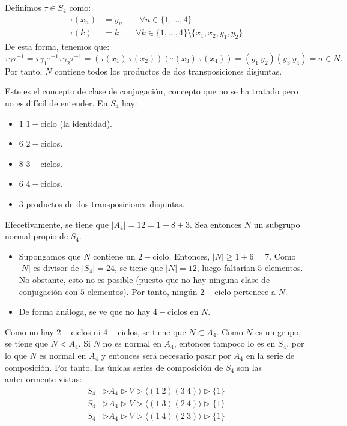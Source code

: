 \begin{ejercicio}
\begin{enumerate}
\begin{itemize}
            Definimos $\tau\in S_4$ como:
            \begin{align*}
                \tau(x_n) &= y_n\qquad \forall n\in \{1,\ldots,4\} \\
                \tau(k) &= k\qquad \forall k\in \{1,\ldots,4\}\setminus\{x_1,x_2,y_1,y_2\}
            \end{align*}
            De esta forma, tenemos que:
            \begin{equation*}
                \tau\gamma\tau^{-1} = \tau\gamma_1\tau^{-1}\tau\gamma_2\tau^{-1} = (\tau(x_1)\ \tau(x_2))(\tau(x_3)\ \tau(x_4)) = (y_1\ y_2)(y_3\ y_4)=\sigma\in N.
            \end{equation*}
            Por tanto, $N$ contiene todos los productos de dos transposiciones disjuntas.
        \end{itemize}
        Este es el concepto de clase de conjugación, concepto que no se ha tratado pero no es difícil de entender. En $S_4$ hay:
        \begin{itemize}
            \item $1$ $1-$ciclo (la identidad).
            \item $6$ $2-$ciclos.
            \item $8$ $3-$ciclos.
            \item $6$ $4-$ciclos.
            \item $3$ productos de dos transposiciones disjuntas.
        \end{itemize}

        Efecetivamente, se tiene que $|A_4|=12=1+8+3$. Sea entonces $N$ un subgrupo normal propio de $S_4$.
        \begin{itemize}
            \item Supongamos que $N$ contiene un $2-$ciclo. Entonces, $|N|\geq 1+6=7$. Como $|N|$ es divisor de $|S_4|=24$, se tiene que $|N|=12$, luego faltarían $5$ elementos. No obstante, esto no es posible (puesto que no hay ninguna clase de conjugación con $5$ elementos). Por tanto, ningún $2-$ciclo pertenece a $N$.
            \item De forma análoga, se ve que no hay $4-$ciclos en $N$.
        \end{itemize}
        Como no hay $2-$ciclos ni $4-$ciclos, se tiene que $N\subset A_4$. Como $N$ es un grupo, se tiene que $N<A_4$. Si $N$ no es normal en $A_4$, entonces tampoco lo es en $S_4$, por lo que $N$ es normal en $A_4$ y entonces será necesario pasar por $A_4$ en la serie de composición.
        Por tanto, las únicas series de composición de $S_4$ son las anteriormente vistas:
        \begin{align*}
            S_4 &\rhd A_4 \rhd V \rhd \langle (1\ 2)(3\ 4) \rangle  \rhd \{1\} \\
            S_4 &\rhd A_4 \rhd V \rhd \langle (1\ 3)(2\ 4) \rangle  \rhd \{1\} \\
            S_4 &\rhd A_4 \rhd V \rhd \langle (1\ 4)(2\ 3) \rangle  \rhd \{1\}
        \end{align*}


\end{enumerate}
\end{ejercicio}
